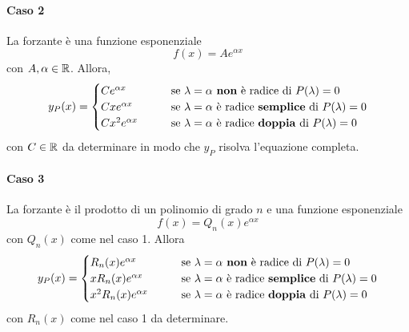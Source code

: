 \paragraph{Caso 2} La forzante è una funzione esponenziale
\begin{equation}
    f(x)= A e^{\alpha x}
\end{equation}
con $A, \alpha \in \mathbb{R}$. Allora, 
\begin{equation}
    y_P(x)= \begin{cases}
        C e^{\alpha x} &\qquad \text{se}\ \lambda=\alpha\ \text{\textbf{non} è radice di}\ P(\lambda)=0\\
        C xe^{\alpha x} &\qquad \text{se}\ \lambda=\alpha\ \text{è radice \textbf{semplice} di}\ P(\lambda)=0\\
        Cx^2 e^{\alpha x} &\qquad \text{se}\ \lambda=\alpha\ \text{è radice \textbf{doppia} di}\ P(\lambda)=0\\
    \end{cases}
\end{equation}
con $C \in \mathbb{R}$ da determinare in modo che $y_P$ risolva l'equazione completa.
\paragraph{Caso 3} La forzante è il prodotto di un polinomio di grado $n$ e una funzione esponenziale
\begin{equation}
    f(x)=Q_n(x) e^{\alpha x}
\end{equation}
con $Q_n(x)$ come nel caso 1. Allora
\begin{equation}
    y_P(x)= \begin{cases}
        R_n(x) e^{\alpha x} &\qquad \text{se}\ \lambda=\alpha\ \text{\textbf{non} è radice di}\ P(\lambda)=0\\
        x R_n(x)e^{\alpha x} &\qquad \text{se}\ \lambda=\alpha\ \text{è radice \textbf{semplice} di}\ P(\lambda)=0\\
        x^2 R_n(x) e^{\alpha x} &\qquad \text{se}\ \lambda=\alpha\ \text{è radice \textbf{doppia} di}\ P(\lambda)=0\\
    \end{cases}
\end{equation}
con $R_n(x)$ come nel caso 1 da determinare.
